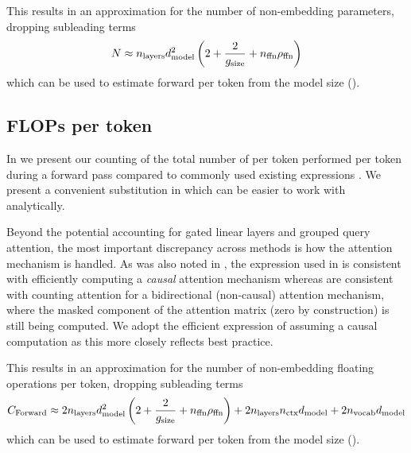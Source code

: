 

This results in an approximation for the number of non-embedding parameters, dropping subleading terms
\begin{equation}
    N \approx n_\text{layers}d_\text{model}^2\left(2+ \frac2{g_{\text{size}}} + n_\text{ffn}\rho_{\text{ffn}}\right)
    \label{eq:non-embedding-parameters}
\end{equation}
which can be used to estimate forward \flops per token from the model size ().

\FloatBarrier
\subsection{FLOPs per token}
\label{ssec:flops-per-token}

In  we present our counting of the total number of \flops per token performed per token during a forward pass compared to commonly used existing expressions \citep{DBLP:journals/corr/abs-2001-08361,DBLP:journals/corr/abs-2203-15556,DBLP:conf/sc/NarayananSCLPKV21}.
We present a convenient substitution in  which can be easier to work with analytically.

Beyond the potential accounting for gated linear layers and grouped query attention, the
most important discrepancy across methods is how the attention mechanism is handled.
As was also noted in \citet{DBLP:journals/corr/abs-2406-19146},
the expression used in \citet{DBLP:journals/corr/abs-2001-08361}
is consistent with efficiently computing a \emph{causal} attention mechanism \citep{DBLP:conf/nips/DaoFERR22,DBLP:conf/iclr/Dao24}
whereas \citet{DBLP:journals/corr/abs-2203-15556,DBLP:conf/sc/NarayananSCLPKV21}
are consistent with counting attention \flops for a bidirectional (non-causal) attention mechanism,
where the masked component of the attention matrix (zero by construction) is still being computed.
We adopt the efficient expression of assuming a causal computation as this more closely reflects best practice.









This results in an approximation for the number of non-embedding floating operations per token, dropping subleading terms
\begin{equation}
    C_{\text{Forward}}\approx 2n_\text{layers}d_\text{model}^2\left(2+ \frac2{g_{\text{size}}} + n_\text{ffn}\rho_{\text{ffn}}\right)
	+2n_\text{layers}n_\text{ctx}d_\text{model}
    +2n_\text{vocab}d_\text{model}
    \label{eq:non-embedding-flops}
\end{equation}
which can be used to estimate forward \flops per token from the model size ().
